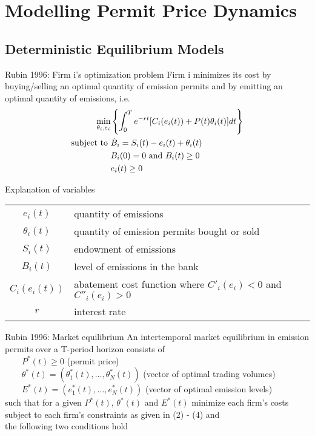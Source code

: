 \section{Modelling Permit Price Dynamics}
\subsection{Deterministic Equilibrium Models}

{Rubin 1996: Firm i's optimization problem}
Firm i minimizes its cost by buying/selling an optimal quantity of emission permits and by emitting an optimal quantity of emissions, i.e.
\begin{align}
\min_{\theta_i, e_i} & \left\{ \int_0^T e^{-rt} [C_i(e_i(t)) + P(t)\theta_i(t)]dt \right\} \\
\textnormal{subject to }
&\dot{B}_i = S_i(t) - e_i(t) + \theta_i(t) \\
&            B_i(0) = 0 \textnormal{ and } B_i(t) \ge 0 \\
&            e_i(t) \ge 0
\end{align}

{Explanation of variables}
\begin{tiny}
\begin{tabular}{cl}
$e_i(t)$ & quantity of emissions \\
$\theta_i(t)$ & quantity of emission permits bought or sold \\
$S_i(t)$ & endowment of emissions \\
$B_i(t)$ & level of emissions in the bank\\
$C_i(e_i(t))$ & abatement cost function where $C'_i(e_i) < 0$ and $C''_i(e_i) > 0$ \\
$r$ & interest rate \\
\end{tabular}
\end{tiny}


{Rubin 1996: Market equilibrium}
An intertemporal market equilibrium in emission permits over a T-period horizon consists of \\
$\qquad P^*(t) \ge 0$ (permit price) \\
$\qquad \theta^*(t) = (\theta^*_1(t), \ldots, \theta^*_N(t))$ (vector of optimal trading volumes) \\
$\qquad E^*(t) = (e^*_1(t), \ldots, e^*_N(t))$ (vector of optimal emission levels) \\
such that for a given $P^*(t)$,
$\theta^*(t)$ and $E^*(t)$ minimize each firm's costs subject to each firm's constraints as given in (2) - (4) and \\
the following two conditions hold

